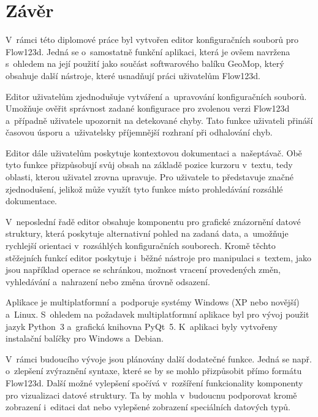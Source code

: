 \documentclass[FM,bw,DP]{tulthesis}
\begin{document}





\chapter*{Závěr}
V~rámci této diplomové práce byl vytvořen editor konfiguračních souborů pro Flow123d. Jedná se o~samostatně funkční aplikaci, která je ovšem navržena s~ohledem na její použití jako součást softwarového balíku GeoMop, který obsahuje další nástroje, které usnadňují práci uživatelům Flow123d.

Editor uživatelům zjednodušuje vytváření a~upravování konfiguračních souborů. Umožňuje ověřit správnost zadané konfigurace pro zvolenou verzi Flow123d a~případně uživatele upozornit na detekované chyby. Tato funkce uživateli přináší časovou úsporu a~uživatelsky příjemnější rozhraní při odhalování chyb.

Editor dále uživatelům poskytuje kontextovou dokumentaci a~našeptávač. Obě tyto funkce přizpůsobují svůj obsah na základě pozice kurzoru v~textu, tedy oblasti, kterou uživatel zrovna upravuje. Pro uživatele to představuje značné zjednodušení, jelikož může využít tyto funkce místo prohledávání rozsáhlé dokumentace.

V~neposlední řadě editor obsahuje komponentu pro grafické znázornění datové struktury, která poskytuje alternativní pohled na zadaná data, a~umožňuje rychlejší orientaci v~rozsáhlých konfiguračních souborech. Kromě těchto stěžejních funkcí editor poskytuje i~běžné nástroje pro manipulaci s~textem, jako jsou například operace se schránkou, možnost vracení provedených změn, vyhledávání a~nahrazení nebo změna úrovně odsazení.

Aplikace je multiplatformní a~podporuje systémy Windows (XP nebo novější) a~Linux. S~ohledem na požadavek multiplatformní aplikace byl pro vývoj použit jazyk Python~3 a~grafická knihovna PyQt~5. K~aplikaci byly vytvořeny instalační balíčky pro Windows a~Debian.

V~rámci budoucího vývoje jsou plánovány další dodatečné funkce. Jedná se např. o~zlepšení zvýraznění syntaxe, které se by se mohlo přizpůsobit přímo formátu Flow123d. Další možné vylepšení spočívá v~rozšíření funkcionality komponenty pro vizualizaci datové struktury. Ta by mohla v~budoucnu podporovat kromě zobrazení i~editaci dat nebo vylepšené zobrazení speciálních datových typů.
\end{document}
